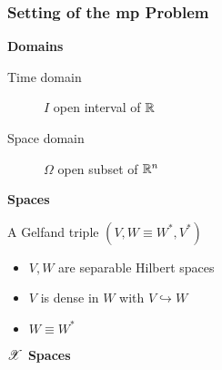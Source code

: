 \begin{frame}
    \frametitle{Setting of the \acrfull{mp} Problem}

    \vspace*{\fill}
    \begin{multicols}{2}
        
        \begin{center}
            {\color{\accentcolor} \Large \textbf{Domains}}
            \vspace*{0.5cm}

            \begin{minipage}{0.4\textwidth}
                \begin{description}
                    \item[Time domain] $I$ open interval of $\mathbb{R}$
                    \item[Space domain] $\Omega$ open subset of $\mathbb{R}^{n}$
                \end{description}
            \end{minipage}
        \end{center}

        \vfill\null
        \columnbreak

        \begin{center}
            {\color{\accentcolor} \Large \textbf{Spaces}}
            \vspace*{0.5cm}

            \begin{minipage}{0.4\textwidth}
                A Gelfand triple $\left( V, W \equiv W^*, V^* \right)$
                \begin{itemize}
                    \item $V, W$ are separable Hilbert spaces
                    \item $V$ is dense in $W$ with $V \hookrightarrow W$
                    \item $W \equiv W^*$
                \end{itemize}
            \end{minipage}
        \end{center}

    \end{multicols}

    \vspace*{\fill}

    \begin{center}
        {\color{\accentcolor} \Large $\mathscr{X}$ \textbf{Spaces}}
        \vspace*{0.25cm}


\end{center}
\end{frame}
